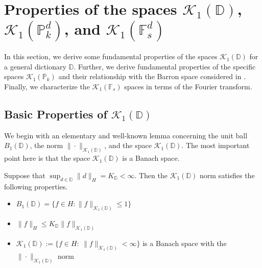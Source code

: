 \section{Properties of the spaces $\mathcal{K}_1(\mathbb{D})$, $\mathcal{K}_1(\mathbb{P}^d_k)$, and $\mathcal{K}_1(\mathbb{F}^d_s)$}\label{spectral-barron-section}
In this section, we derive some fundamental properties of the spaces $\mathcal{K}_1(\mathbb{D})$ for a general dictionary $\mathbb{D}$. Further, we derive fundamental properties of the specific spaces $\mathcal{K}_1(\mathbb{P}_k)$ and their relationship with the Barron space considered in \cite{ma2019barron, wojtowytsch2020representation}. Finally, we characterize the $\mathcal{K}_1(\mathbb{F}_s)$ spaces in terms of the Fourier transform.

\subsection{Basic Properties of $\mathcal{K}_1(\mathbb{D})$}
We begin with an elementary and well-known lemma concerning the unit ball $B_1(\mathbb{D})$, the norm $\|\cdot\|_{\mathcal{K}_1(\mathbb{D})}$, and the space $\mathcal{K}_1(\mathbb{D})$. The most important point here is that the space $\mathcal{K}_1(\mathbb{D})$ is a Banach space.
\begin{lemma}\label{fundamental-norm-lemma}
 Suppose that $\sup_{d\in \mathbb{D}} \|d\|_H = K_\mathbb{D} < \infty$. Then the $\mathcal{K}_1(\mathbb{D})$ norm satisfies the following properties.
 \begin{itemize}
  \item $B_1(\mathbb{D}) = \{f\in H:\|f\|_{\mathcal{K}_1(\mathbb{D})}\leq 1\}$
  \item $\|f\|_H\leq K_\mathbb{D}\|f\|_{\mathcal{K}_1(\mathbb{D})}$
  \item $\mathcal{K}_1(\mathbb{D}) := \{f\in H:~\|f\|_{\mathcal{K}_1(\mathbb{D})} < \infty\}$ is a Banach space with the $\|\cdot\|_{\mathcal{K}_1(\mathbb{D})}$ norm
 \end{itemize}
 
\end{lemma}
